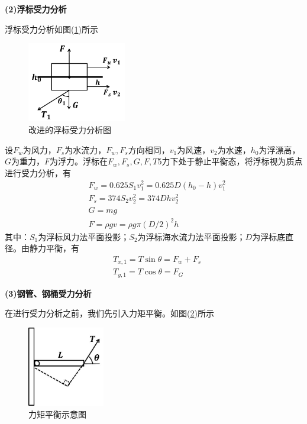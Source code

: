 \documentclass[UTF8]{ctexbook}
\theoremstyle{nonumberplain}
\begin{document}
            \par
            \textbf{(2)浮标受力分析}
            \par
            浮标受力分析如图(\ref{改进的浮标受力分析图})所示
            \begin{figure}[H]
            \centering
            \includegraphics[height=3.5cm]{images/Improved_buoy_force_analysis_chart.jpg}
            \caption{改进的浮标受力分析图}
            \label{改进的浮标受力分析图}
            \end{figure}
            设$F_w$为风力，$F_s$为水流力，$F_w,F_s$方向相同，$v_1$为风速，$v_2$为水速，$h_0$为浮漂高，$G$为重力，$F$为浮力。浮标在$F_w,F_s,G,F,T$5力下处于静止平衡态，将浮标视为质点进行受力分析，有
            \begin{align*}
            & F_w = 0.625S_1 v_1^2 = 0.625 D(h_0-h)v_1^2\\
            & F_s = 374S_2 v_2^2 = 374 D hv_2^2\\
            & G = mg\\
            & F=\rho g v = \rho g\pi (D/2)^2h
            \end{align*}
            其中：$S_1$为浮标风力法平面投影；$S_2$为浮标海水流力法平面投影；$D$为浮标底直径。由静力平衡，有
            \begin{align*}
            & T_{x,1} = T\sin \theta = F_w+F_s\\
            & T_{y,1} = T\cos\theta = F_G
            \end{align*}
            \par
            \textbf{(3)钢管、钢桶受力分析}
            \par
            在进行受力分析之前，我们先引入力矩平衡。如图(\ref{力矩平衡示意图})所示
            \begin{figure}[H]
            \centering
            \includegraphics[height=3.5cm]{images/Moment_balance_diagram.jpg}
            \caption{力矩平衡示意图}
            \label{力矩平衡示意图}
            \end{figure}
\end{document}

